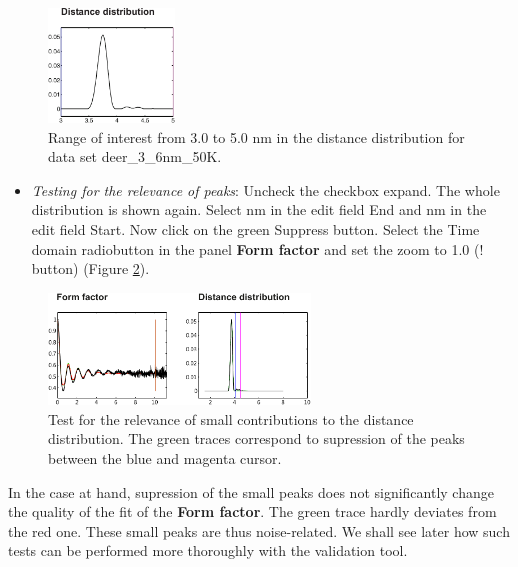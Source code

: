 \documentclass[11pt,a4paper]{article}
\begin{document}
\begin{figure}[ht]
 \vspace{10mm}
 	\begin{center}
		\includegraphics[width=0.30\textwidth]{figure3.pdf}
	\end{center}
	\caption{Range of interest from 3.0 to 5.0 nm in the distance distribution for data set {\ttfamily deer\_3\_6nm\_50K}.}
	\label{fig:3}
\end{figure}

\begin{itemize}
\item \emph{Testing for the relevance of peaks}: Uncheck the checkbox expand. The whole distribution is shown again. Select {} nm in the edit field {\ttfamily End} and {} nm in the edit field {\ttfamily Start}. Now click on the green {\ttfamily Suppress button}. Select the {\ttfamily Time domain} radiobutton in the panel {\ttfamily \bf Form factor} and set the zoom to 1.0 ({\ttfamily !} button) (Figure \ref{fig:4}). 
\end{itemize}

\begin{figure}[ht]
 \vspace{10mm}
 	\begin{center}
		\includegraphics[width=0.62\textwidth]{figure4.pdf}
	\end{center}
	\caption{Test for the relevance of small contributions to the distance distribution. The green traces correspond to supression of the peaks between the blue and magenta cursor.}
	\label{fig:4}
\end{figure}

In the case at hand, supression of the small peaks does not significantly change the quality of the fit of the {\ttfamily \bf Form factor}. The green trace hardly deviates from the red one. These small peaks are thus noise-related. We shall see later how such tests can be performed more thoroughly with the validation tool. 
\end{document}
